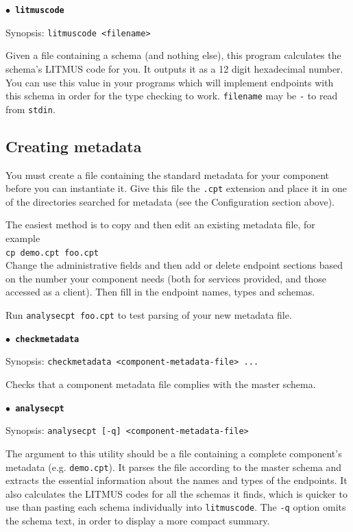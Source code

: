 \documentclass[12pt,a4paper,twoside]{article}
\renewcommand{\_}{\texttt{\symbol{95}}}
\begin{document}
\textbf{\texttt{\large $\bullet$ litmuscode}}

Synopsis:
\verb^litmuscode <filename>^

Given a file containing a schema (and nothing
else), this program calculates the schema's LITMUS code for you.
It outputs it as a 12 digit hexadecimal number. You can use this value
in your programs which will implement endpoints with this schema in order
for the type checking to work. \verb^filename^ may be \verb^-^ to
read from \verb^stdin^.

\subsection{Creating metadata}

You must create a file containing the standard metadata for your
component before you can instantiate it. Give this file the
\verb^.cpt^ extension and place it in one of the directories
searched for metadata (see the Configuration section above).

The easiest method is to copy and then edit an existing metadata file,
for example\\
\verb^cp demo.cpt foo.cpt^\\
Change the administrative fields and then add or delete endpoint
sections based on the number your component needs 
(both for services provided, and those accessed as a client).
Then fill in the endpoint names, types and schemas.

Run \verb^analysecpt foo.cpt^ to test parsing of your new metadata file.

\textbf{\texttt{\large $\bullet$ checkmetadata}}

Synopsis:
\verb^checkmetadata <component-metadata-file> ...^

Checks that a component metadata file complies
with the master schema.

\textbf{\texttt{\large $\bullet$ analysecpt}}

Synopsis:
\verb^analysecpt [-q] <component-metadata-file>^

The argument to this utility should be
a file containing a complete component's metadata (e.g. \verb^demo.cpt^).
It parses the file according to the master schema and extracts
the essential information about the names and types of the endpoints.
It also calculates
the LITMUS codes for all the schemas it finds, which is quicker
to use than pasting each schema individually into \verb^litmuscode^.
The \verb^-q^ option omits the schema text, in order to display a
more compact summary.
\end{document}
